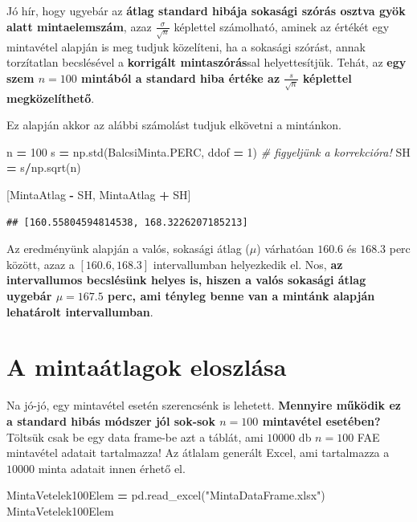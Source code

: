 \documentclass[
]{book}
\newenvironment{Shaded}{\begin{snugshade}}{\end{snugshade}}
\newcommand{\CommentTok}[1]{\textcolor[rgb]{0.56,0.35,0.01}{\textit{#1}}}
\newcommand{\DecValTok}[1]{\textcolor[rgb]{0.00,0.00,0.81}{#1}}
\newcommand{\NormalTok}[1]{#1}
\newcommand{\OperatorTok}[1]{\textcolor[rgb]{0.81,0.36,0.00}{\textbf{#1}}}
\newcommand{\StringTok}[1]{\textcolor[rgb]{0.31,0.60,0.02}{#1}}
\begin{document}
Jó hír, hogy ugyebár az \textbf{átlag standard hibája sokasági szórás osztva gyök alatt mintaelemszám}, azaz \(\frac{\sigma}{\sqrt{n}}\) képlettel számolható, aminek az értékét egy mintavétel alapján is meg tudjuk közelíteni, ha a sokasági szórást, annak torzítatlan becslésével a \textbf{korrigált mintaszórás}sal helyettesítjük. Tehát, az \textbf{egy szem \(n=100\) mintából a standard hiba értéke az \(\frac{s}{\sqrt{n}}\) képlettel megközelíthető}.

Ez alapján akkor az alábbi számolást tudjuk elkövetni a mintánkon.

\begin{Shaded}
\begin{Highlighting}[]
\NormalTok{n }\OperatorTok{=} \DecValTok{100}
\NormalTok{s }\OperatorTok{=}\NormalTok{ np.std(BalcsiMinta.PERC, ddof }\OperatorTok{=} \DecValTok{1}\NormalTok{) }\CommentTok{\# figyeljünk a korrekcióra!}
\NormalTok{SH }\OperatorTok{=}\NormalTok{ s}\OperatorTok{/}\NormalTok{np.sqrt(n)}

\NormalTok{[MintaAtlag }\OperatorTok{{-}}\NormalTok{ SH, MintaAtlag }\OperatorTok{+}\NormalTok{ SH]}
\end{Highlighting}
\end{Shaded}

\begin{verbatim}
## [160.55804594814538, 168.3226207185213]
\end{verbatim}

Az eredményünk alapján a valós, sokasági átlag (\(\mu\)) várhatóan \(160.6\) és \(168.3\) perc között, azaz a \([160.6,168.3]\) intervallumban helyezkedik el. Nos, \textbf{az intervallumos becslésünk helyes is, hiszen a valós sokasági átlag uygebár \(\mu=167.5\) perc, ami tényleg benne van a mintánk alapján lehatárolt intervallumban}.

\section{A mintaátlagok eloszlása}\label{a-mintauxe1tlagok-eloszluxe1sa}

Na jó-jó, egy mintavétel esetén szerencsénk is lehetett. \textbf{Mennyire működik ez a standard hibás módszer jól sok-sok \(n=100\) mintavétel esetében?} Töltsük csak be egy data frame-be azt a táblát, ami \(10000\) db \(n=100\) FAE mintavétel adatait tartalmazza! Az átlalam generált Excel, ami tartalmazza a \(10000\) minta adatait innen érhető el.

\begin{Shaded}
\begin{Highlighting}[]
\NormalTok{MintaVetelek100Elem }\OperatorTok{=}\NormalTok{ pd.read\_excel(}\StringTok{"MintaDataFrame.xlsx"}\NormalTok{)}
\NormalTok{MintaVetelek100Elem}
\end{Highlighting}
\end{Shaded}
\end{document}
